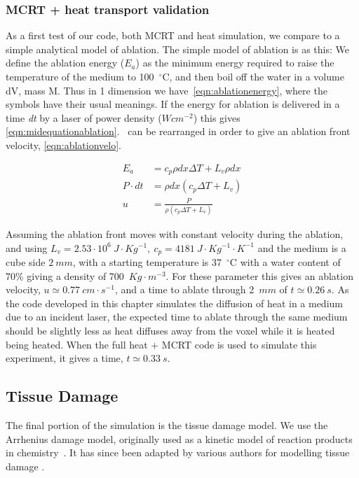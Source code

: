 \subsubsection{MCRT + heat transport validation}

As a first test of our code, both MCRT and heat simulation, we compare to a simple analytical model of ablation. The simple model of ablation is as this: We define the ablation energy ($E_a$) as the minimum energy required to raise the temperature of the medium to 100~$^{\circ}$C, and then boil off the water in a volume dV, mass M. Thus in 1 dimension we have~\cref{eqn:ablationenergy}, where the symbols have their usual meanings. If the energy for ablation is delivered in a time \textit{dt} by a laser of power density ($Wcm^{-2}$) this gives \cref{eqn:midequationablation}.~ can be rearranged in order to give an ablation front velocity, \cref{eqn:ablationvelo}.


\begin{align}
E_a &= c_p \rho dx \Delta T + L_v \rho dx \label{eqn:ablationenergy}\\
P\cdot dt &= \rho dx (c_p \Delta T + L_v) \label{eqn:midequationablation} \\
u &= \frac{P}{\rho(c_p\Delta T+ L_v)} \label{eqn:ablationvelo}
\end{align}

Assuming the ablation front moves with constant velocity during the ablation, and using $L_v=2.53\cdot 10^6\ J\cdot Kg^{-1},\ c_p=4181\ J\cdot Kg^{-1}\cdot K^{-1}$ and the medium is a cube side $2\ mm$, with a starting temperature is 37~$^{\circ}$C with a water content of 70\% giving a density of 700~$Kg\cdot m^{-3}$. For these parameter this gives an ablation velocity, $u\simeq 0.77\ cm\cdot s^{-1}$, and a time to ablate through 2~$mm$ of $t \simeq 0.26~s$.
As the code developed in this chapter simulates the diffusion of heat in a medium due to an incident laser, the expected time to ablate through the same medium should be slightly less as heat diffuses away from the voxel while it is heated being heated. When the full heat + MCRT code is used to simulate this experiment, it gives a time, $t \simeq 0.33~s$.\\	
	
\subsection{Tissue Damage}
\label{sec:tissuedamage}
The final portion of the simulation is the tissue damage model. We use the Arrhenius damage model, originally used as a kinetic model of reaction products in chemistry~\cite{pearce2009relationship}. It has since been adapted by various authors for modelling tissue damage \cite{hendriques1947studies,jiang2002effects}.

